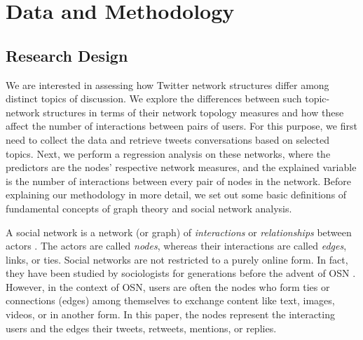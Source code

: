 \section{Data and Methodology}\label{Data}\thispagestyle{SectionFirstPage} %
\subsection{Research Design}
We are interested in assessing how Twitter network structures differ among distinct topics of discussion. We explore the differences between such topic-network structures in terms of their network topology measures and how these affect the number of interactions between pairs of users. For this purpose, we first need to collect the data and retrieve tweets conversations based on selected topics. Next, we perform a regression analysis on these networks, where the predictors are the nodes' respective network measures, and the explained variable is the number of interactions between every pair of nodes in the network.
Before explaining our methodology in more detail, we set out some basic definitions of fundamental concepts of graph theory and social network analysis.

A social network is a network (or graph) of \textit{interactions} or \textit{relationships} between actors \citep{aggarwal:2011}. The actors are called \textit{nodes}, whereas their interactions are called \textit{edges}, links, or ties. Social networks are not restricted to a purely online form. In fact, they have been studied by sociologists for generations before the advent of OSN \citep[see, e.g.,][]{milgram:1967}. However, in the context of OSN, users are often the nodes who form ties or connections (edges) among themselves to exchange content like text, images, videos, or in another form. In this paper, the nodes represent the interacting users and the edges their tweets, retweets, mentions, or replies.

